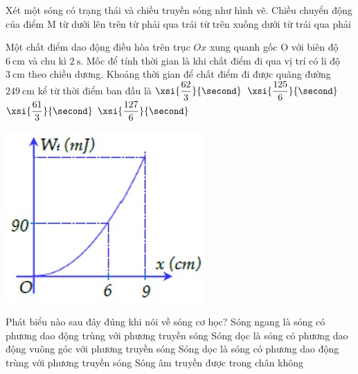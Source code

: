 \begin{ex}
Xét một sóng có trạng thái và chiều truyền sóng như hình vẽ. Chiều chuyển động của điểm M
	\choice
	{\True từ dưới lên trên}
	{từ phải qua trái}
	{từ trên xuống dưới}
	{từ trái qua phải}
	\loigiai{}
\end{ex}
\begin{ex}
Một chất điểm dao động điều hòa trên trục $Ox$ xung quanh gốc O với biên độ $\SI{6}{\centi\meter}$ và chu kì $\SI{2}{\second}$. Mốc để tính thời gian là khi chất điểm đi qua vị trí có li độ $\SI{3}{\centi\meter}$ theo chiều dương. Khoảng thời gian để chất điểm đi được quãng đường $\SI{249}{\centi\meter}$ kể từ thời điểm ban đầu là	
	\choice
	{$\xsi{\dfrac{62}{3}}{\second}$}
	{\True $\xsi{\dfrac{125}{6}}{\second}$}
	{$\xsi{\dfrac{61}{3}}{\second}$}
	{$\xsi{\dfrac{127}{6}}{\second}$}
\end{ex}
\begin{ex}
	{\includegraphics[scale=0.7]{../figs/G11-FINAL-SEM1-002-2}}
\end{ex}
\begin{ex}
Phát biểu nào sau đây đúng khi nói về sóng cơ học?	
	\choice
	{Sóng ngang là sóng có phương dao động trùng với phương truyền sóng}
	{Sóng dọc là sóng có phương dao động vuông góc với phương truyền sóng}
	{\True Sóng dọc là sóng có phương dao động trùng với phương truyền sóng}
	{Sóng âm truyền được trong chân không}
	\loigiai{}
\end{ex}
